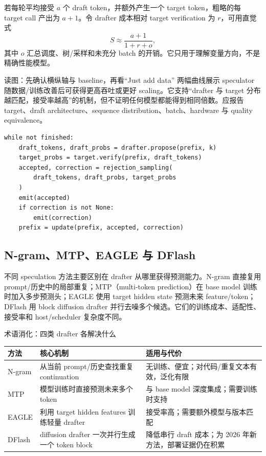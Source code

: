 若每轮平均接受 $a$ 个 draft token，并额外产生一个 target token，粗略的每 target call 产出为 $a+1$。令 drafter 成本相对 target verification 为 $r$，可用直觉式
\[
S\approx \frac{a+1}{1+r+o},
\]
其中 $o$ 汇总调度、树/采样和未充分 batch 的开销。它只用于理解变量方向，不是精确性能模型。


\begin{knowledgebox}{读图：先确认横纵轴与 baseline，再看“Just add data”}
两幅曲线展示 speculator 随数据/训练改善后可获得更高吞吐或更好 scaling。它支持“drafter 与 target 分布越匹配，接受率越高”的机制，但不证明任何模型都能得到相同倍数。应报告 target、draft architecture、sequence distribution、batch、hardware 与 quality equivalence。
\end{knowledgebox}

\begin{lstlisting}[caption={Lossless speculative decoding 的概念流程}]
while not finished:
    draft_tokens, draft_probs = drafter.propose(prefix, k)
    target_probs = target.verify(prefix, draft_tokens)
    accepted, correction = rejection_sampling(
        draft_tokens, draft_probs, target_probs
    )
    emit(accepted)
    if correction is not None:
        emit(correction)
    prefix = update(prefix, accepted, correction)
\end{lstlisting}

\subsection{N-gram、MTP、EAGLE 与 DFlash}

不同 speculation 方法主要区别在 drafter 从哪里获得预测能力。N-gram 直接复用 prompt/历史中的局部重复；MTP（multi-token prediction）在 base model 训练时加入多步预测头；EAGLE 使用 target hidden state 预测未来 feature/token；DFlash 用 block diffusion drafter 并行去噪多个候选。它们的训练成本、适配性、接受率和 host/scheduler 复杂度不同。


\begin{knowledgebox}{术语消化：四类 drafter 各解决什么}
\begin{tabularx}{\textwidth}{L{2.2cm}YY}
\toprule
方法 & 核心机制 & 适用与代价 \\
\midrule
N-gram & 从当前 prompt/历史查找重复 continuation & 无训练、便宜；对代码/重复文本有效，泛化有限 \\
MTP & 模型训练时直接预测未来多个 token & 与 base model 深度集成；需要训练时支持 \\
EAGLE & 利用 target hidden features 训练轻量 drafter & 接受率高；需要额外模型与版本匹配 \\
DFlash & diffusion drafter 一次并行生成一个 token block & 降低串行 draft 成本；为 2026 年新方法，部署证据仍在积累 \\
\bottomrule
\end{tabularx}
\end{knowledgebox}

